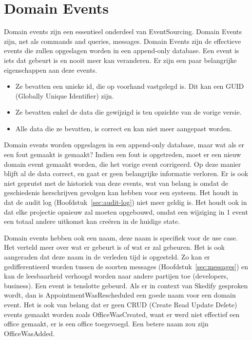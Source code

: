 
\section{Domain Events}
\label{sec:domain-events}

Domain events zijn een essentieel onderdeel van EventSourcing. Domain Events zijn, net als commands and queries, messages. Domain Events zijn de effectieve events die zullen opgeslagen worden in een append-only database. Een event is iets dat gebeurt is en nooit meer kan veranderen. Er zijn een paar belangrijke eigenschappen aan deze events.

\begin{itemize}
  \item{Ze bevatten een unieke id, die op voorhand vastgelegd is. Dit kan een GUID (Globally Unique Identifier) zijn.}
  \item{Ze bevatten enkel de data die gewijzigd is ten opzichte van de vorige versie.}
  \item{Alle data die ze bevatten, is correct en kan niet meer aangepast worden.}
\end{itemize}

Domain events worden opgeslagen in een append-only database, maar wat als er een fout gemaakt is gemaakt?
Indien een fout is opgetreden, moet er een nieuw domain event gemaakt worden, die het vorige event corrigeerd. Op deze manier blijft al de data correct, en gaat er geen belangrijke informatie verloren. Er is ook niet geprutst met de historiek van deze events, wat van belang is omdat de geschiedenis herschrijven gevolgen kan hebben voor een systeem. Het houdt in dat de audit log (Hoofdstuk~\ref{sec:audit-log}) niet meer geldig is. Het houdt ook in dat elke projectie opnieuw zal moeten opgebouwd, omdat een wijziging in 1 event een totaal andere uitkomst kan creëren in de huidige state.

Domain events hebben ook een naam, deze naam is specifiek voor de use case. Het verteld meer over wat er gebeurt is of wat er zal gebeuren. Het is ook aangeraden dat deze naam in de verleden tijd is opgesteld. Zo kan er gedifferentieerd worden tussen de soorten messages (Hoofdstuk~\ref{sec:messages}) en kan de leesbaarheid verhoogd worden naar andere partijen toe (developers, business). Een event is tenslotte gebeurd. Als er in context van Skedify gesproken wordt, dan is AppointmentWasRescheduled een goede naam voor een domain event. Het is ook van belang dat er geen CRUD (Create Read Update Delete) events gemaakt worden zoals OfficeWasCreated, want er werd niet effectief een office gemaakt, er is een office toegevoegd. Een betere naam zou zijn OfficeWasAdded.
